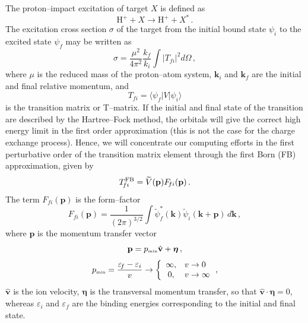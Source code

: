 \documentclass[10pt]{article}
\begin{document}
The proton--impact excitation of target $X$ is defined as 
\begin{equation}
 \mbox{H}^+ + X \rightarrow \mbox{H}^+ + X^*\,.
\end{equation}
The excitation cross section $\sigma$ of the target from the initial bound
state $\psi_i$ to the excited state $\psi_{\!f}$ may be written as 
\begin{equation}
 \sigma=\frac{\mu^2}{4\pi^2}\frac{k_{\!f}}{k_i}\int{\left|T_{\!fi}\right|^2 
 d\Omega}\,,
  \label{eq:cross-section}
\end{equation}
where $\mu$ is the reduced mass of the proton--atom system, 
$\mathbf{k}_i$ and $\mathbf{k}_{\!f}$ are the initial and final relative 
momentum, and 
\begin{equation}
 T_{\!fi}=\langle \psi_{\!f}|V|\psi_i\rangle
 \label{eq:transition-matrix}
\end{equation}
is the transition matrix or T--matrix.
If the initial and final state of the transition are described by
the Hartree--Fock method, the orbitals will give the correct high 
energy limit in the first order approximation (this is not the case 
for the charge exchange process). Hence, we will concentrate our 
computing efforts in the first perturbative order of the transition
matrix element through the first Born (FB) approximation, given by
\begin{equation}
 T_{\!fi}^{\mbox{\scriptsize FB}} = \widetilde{V}(\mathbf{p}) F_{\!fi}(\mathbf{p}) \,.
 \label{eq:firstbornTmatrix}
\end{equation}
The term $F_{\!fi}(\mathbf{p})$ is the form--factor
\begin{equation}
 F_{fi}(\mathbf{p}) = \frac{1}{(2\pi)^{3/2}} 
 \int{\widetilde{\psi}_{\!f}^*(\mathbf{k})
 \widetilde{\psi}_i(\mathbf{k}+\mathbf{p})\,d\mathbf{k}}\,,
 \label{eq:form-factor}
\end{equation}
where $\mathbf{p}$ is the momentum transfer vector
\begin{equation}
 \mathbf{p} = p_{\mbox{\tiny min}} \hat{\mathbf{v}} + \boldsymbol{\eta} \,,
\end{equation}
\begin{equation}
 p_{\mbox{\tiny min}} = \frac{\varepsilon_{\!f}-\varepsilon_i}{v} \rightarrow 
 \bigg\{
 \begin{array}{cl}
  \infty, &v\rightarrow 0 \\
  0, &v\rightarrow \infty
 \end{array}
 \,,
 \label{eq:pmin}
\end{equation}
$\hat{\mathbf{v}}$ is the ion velocity, $\boldsymbol{\eta}$ is
the transversal momentum transfer, so that 
$\hat{\mathbf{v}} \cdot \boldsymbol{\eta}=0$, whereas $\varepsilon_i$ 
and $\varepsilon_{\!f}$ are the binding energies corresponding to the 
initial and final state.
\end{document}
